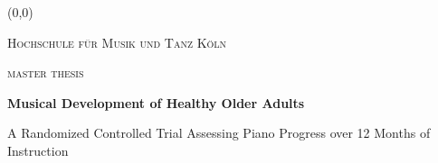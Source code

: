 \begin{titlepage}
	\begin{addmargin}{\offsetCoverPage} 
		
		\setlength{\unitlength}{1cm}
		\begin{picture}(0,0)
		\end{picture}
		\begin{center}
			{\scshape\LARGE Hochschule für Musik und Tanz Köln\par}
		\end{center}\centering
	
	\end{addmargin}
		\addvspace{2.6cm}
		\begin{addmargin}[\marginCoverPage]{0cm}
			\begin{center}
				{\scshape\Large master thesis\par}
			\end{center}
			
	\vspace{1.5cm}
	{\huge\bfseries Musical Development of Healthy Older Adults \par}

\addvspace{1cm}
\begin{center}
	{\Large A Randomized Controlled Trial Assessing Piano Progress over 12 Months of Instruction}
\end{center}



\end{addmargin}
\end{titlepage}
